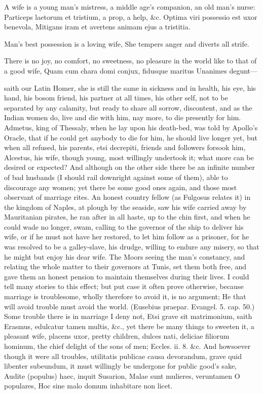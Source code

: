 {A wife is a young man's mistress, a middle age's companion, an
old man's nurse: Particeps laetorum et tristium, a prop, a help, \&c.
Optima viri possessio est uxor benevola,
Mitigans iram et avertens animam ejus a tristitia.

Man's best possession is a loving wife,
She tempers anger and diverts all strife.

There is no joy, no comfort, no sweetness, no pleasure in the world
like to that of a good wife,
Quam cum chara domi conjux, fidusque maritus
Unanimes degunt---

saith our Latin Homer, she is still the same in sickness and in health,
his eye, his hand, his bosom friend, his partner at all times, his
other self, not to be separated by any calamity, but ready to share all
sorrow, discontent, and as the Indian women do, live and die with him,
nay more, to die presently for him. Admetus, king of Thessaly, when he
lay upon his death-bed, was told by Apollo's Oracle, that if he could
get anybody to die for him, he should live longer yet, but when all
refused, his parents, etsi decrepiti, friends and followers forsook
him, Alcestus, his wife, though young, most willingly undertook it;
what more can be desired or expected? And although on the other side
there be an infinite number of bad husbands (I should rail downright
against some of them), able to discourage any women; yet there be some
good ones again, and those most observant of marriage rites. An honest
country fellow (as Fulgosus relates it) in the kingdom of Naples,
at plough by the seaside, saw his wife carried away by
Mauritanian pirates, he ran after in all haste, up to the chin first,
and when he could wade no longer, swam, calling to the governor of the
ship to deliver his wife, or if he must not have her restored, to let
him follow as a prisoner, for he was resolved to be a galley-slave, his
drudge, willing to endure any misery, so that he might but enjoy his
dear wife. The Moors seeing the man's constancy, and relating the whole
matter to their governors at Tunis, set them both free, and gave them
an honest pension to maintain themselves during their lives. I could
tell many stories to this effect; but put case it often prove
otherwise, because marriage is troublesome, wholly therefore to avoid
it, is no argument; He that will avoid trouble must avoid the
world. (Eusebius praepar. Evangel. 5. cap. 50.) Some trouble there is
in marriage I deny not, Etsi grave sit matrimonium, saith Erasmus,
edulcatur tamen multis, \&c., yet there be many things to sweeten
it, a pleasant wife, placens uxor, pretty children, dulces nati,
deliciae filiorum hominum, the chief delight of the sons of men;
Eccles. ii. 8. \&c. And howsoever though it were all troubles,
utilitatis publicae causa devorandum, grave quid libenter
subeundum, it must willingly be undergone for public good's sake,
Audite (populus) haec, inquit Susarion,
Malae sunt mulieres, veruntamen O populares,
Hoc sine malo domum inhabitare non licet.

}
